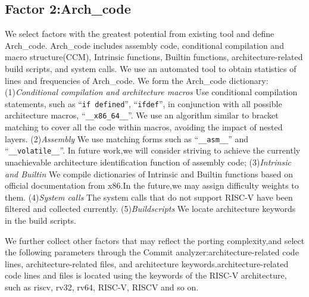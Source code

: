 \documentclass[sigconf,screen,review,anonymous]{acmart}
\begin{document}
\subsection{Factor 2:Arch\_code}

We select factors with the greatest potential from existing tool and define Arch\_code.
Arch\_code includes assembly code, conditional compilation and macro structure(CCM), Intrinsic functions, Builtin functions, architecture-related build scripts, and system calls.
We use an automated tool to obtain statistics of lines and frequencies of Arch\_code.
We form the Arch\_code dictionary:
(1)\textit{Conditional compilation and architecture macros} Use conditional compilation statements, such as ``\texttt{if defined}'', ``\texttt{ifdef}'', in conjunction with all possible architecture macros,
  ``\texttt{\_\_x86\_64\_\_}''.
  We use an algorithm similar to bracket matching to cover all the code within macros, avoiding the impact of nested layers.
  (2)\textit{Assembly} We use matching forms such as ``\texttt{\_\_asm\_\_}'' and ``\texttt{\_\_volatile\_\_}''.
  In future work,we will consider striving to achieve the currently unachievable architecture identification function of assembly code;
  (3)\textit{Intrinsic and Builtin} 
  We compile dictionaries of Intrinsic and Builtin functions based on official documentation from x86\cite{x86intrin}.In the future,we may assign difficulty weights to them.
  (4)\textit{System calls} The system calls that do not support RISC-V have been filtered and collected currently.
  (5)\textit{Buildscripts} We locate architecture keywords in the build scripts.


We further collect other factors that may reflect the porting complexity,and select the following parameters through the Commit analyzer:architecture-related code lines, architecture-related files, and architecture keywords.architecture-related code lines and files is located using the keywords of the RISC-V architecture, such as riscv, rv32, rv64, RISC-V, RISCV and so on.
\end{document}
